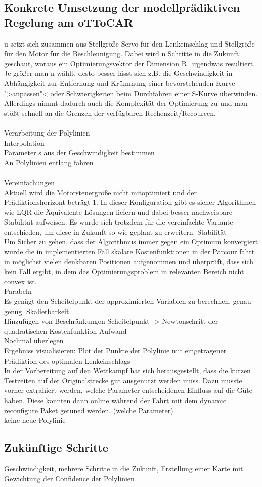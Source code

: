 \subsection{Konkrete Umsetzung der modellprädiktiven Regelung am oTToCAR}
u setzt sich zusammen aus Stellgröße Servo für den Lenkeinschlag und Stellgröße für den Motor für die Beschleunigung. Dabei wird n Schritte in die Zukunft geschaut, woraus ein Optimierungsvektor der Dimension R=irgendwas resultiert. Je größer man n wählt, desto besser lässt sich z.B. die Geschwindigkeit in Abhängigkeit zur Entfernung und Krümmung einer bevorstehenden Kurve ">anpassen"< oder Schwierigkeiten beim Durchfahren einer S-Kurve überwinden. Allerdings nimmt dadurch auch die Komplexität der Optimierung zu und man stößt schnell an die Grenzen der verfügbaren Rechenzeit/Recourcen.\\ \\
Verarbeitung der Polylinien\\
Interpolation\\
Parameter s aus der Geschwindigkeit bestimmen\\
An Polylinien entlang fahren\\ \\
Vereinfachungen\\
Aktuell wird die Motorsteuergröße nicht mitoptimiert und der Prädiktionshorizont beträgt 1. In dieser Konfiguration gibt es sicher Algorithmen wie LQR die Äquivalente Lösungen liefern und dabei besser nachweisbare Stabilität aufweisen. Es wurde sich trotzdem für die vereinfachte Variante entschieden, um diese in Zukunft so wie geplant zu erweitern.
Stabilität\\
Um Sicher zu gehen, dass der Algorithmus immer gegen ein Optimum konvergiert wurde die in implementierten Fall skalare Kostenfunktionen in der Parcour fahrt in möglichst vielen denkbaren Positionen aufgenommen und überprüft, dass sich kein Fall ergibt, in dem das Optimierungsproblem in relevanten Bereich nicht convex ist.
\\
Parabeln
\\
Es genügt den Scheitelpunkt der approximierten Variablen zu berechnen. genau genug.
Skalierbarkeit\\
Hinzufügen von Beschränkungen
Scheitelpunkt -> Newtonschritt der quadratischen Kostenfunktion
Aufwand\\
Nochmal überlegen\\
Ergebniss visualisieren: Plot der Punkte der Polylinie mit eingetragener Prädiktion des optimalen Lenkeinschlags\\
In der Vorbereitung auf den Wettkampf hat sich herausgestellt, dass die kurzen Testzeiten auf der Originalstrecke gut ausgenutzt werden muss. Dazu musste vorher extrahiert werden, welche Parameter entscheidenen Einfluss auf die Güte haben. Diese konnten dann online während der Fahrt mit dem dynamic reconfigure Paket getuned werden. (welche Parameter)\\
keine neue Polylinie\\
\subsection{Zukünftige Schritte}
Geschwindigkeit, mehrere Schritte in die Zukunft, Erstellung einer Karte mit Gewichtung der Confidence der Polylinien